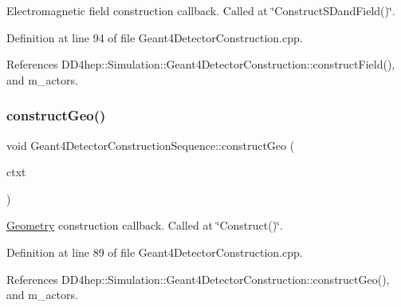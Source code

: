 Electromagnetic field construction callback. Called at \char`\"{}\+Construct\+S\+Dand\+Field()\char`\"{}. 



Definition at line 94 of file Geant4\+Detector\+Construction.\+cpp.



References D\+D4hep\+::\+Simulation\+::\+Geant4\+Detector\+Construction\+::construct\+Field(), and m\+\_\+actors.

\hypertarget{class_d_d4hep_1_1_simulation_1_1_geant4_detector_construction_sequence_a7c2512ab15fa66370409585d60becc99}{}\label{class_d_d4hep_1_1_simulation_1_1_geant4_detector_construction_sequence_a7c2512ab15fa66370409585d60becc99} 
\subsubsection{\texorpdfstring{construct\+Geo()}{constructGeo()}}
{\footnotesize\ttfamily void Geant4\+Detector\+Construction\+Sequence\+::construct\+Geo (\begin{DoxyParamCaption}\item[{\hyperlink{class_d_d4hep_1_1_simulation_1_1_geant4_detector_construction_context}{Geant4\+Detector\+Construction\+Context} $\ast$}]{ctxt }\end{DoxyParamCaption})\hspace{0.3cm}{\ttfamily [virtual]}}



\hyperlink{namespace_d_d4hep_1_1_geometry}{Geometry} construction callback. Called at \char`\"{}\+Construct()\char`\"{}. 



Definition at line 89 of file Geant4\+Detector\+Construction.\+cpp.



References D\+D4hep\+::\+Simulation\+::\+Geant4\+Detector\+Construction\+::construct\+Geo(), and m\+\_\+actors.

\hypertarget{class_d_d4hep_1_1_simulation_1_1_geant4_detector_construction_sequence_ab242c91f95283ed32133f48f2bc573fa}{}\label{class_d_d4hep_1_1_simulation_1_1_geant4_detector_construction_sequence_ab242c91f95283ed32133f48f2bc573fa} 
